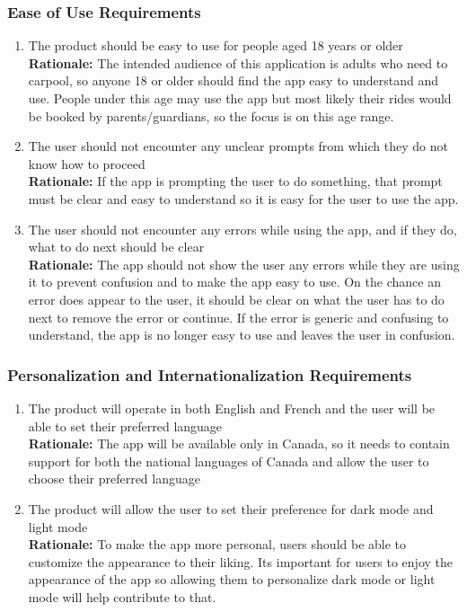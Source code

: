 \documentclass[]{article}
\begin{document}
\subsubsection{Ease of Use Requirements}
\label{ssub:ease_of_use_requirements}
\begin{enumerate}[{UH-EOU}1. ]
	\item The product should be easy to use for people aged 18 years or older \\
	{\bf Rationale:} The intended audience of this application is adults who need to carpool, so anyone 18 or older should find the app easy to understand and use. People under this age may use the app but most likely their rides would be booked by parents/guardians, so the focus is on this age range.
	\item The user should not encounter any unclear prompts from which they do not know how to proceed \\
	{\bf Rationale:} If the app is prompting the user to do something, that prompt must be clear and easy to understand so it is easy for the user to use the app.
	\item The user should not encounter any errors while using the app, and if they do, what to do next should be clear \\
	{\bf Rationale:} The app should not show the user any errors while they are using it to prevent confusion and to make the app easy to use. On the chance an error does appear to the user, it should be clear on what the user has to do next to remove the error or continue. If the error is generic and confusing to understand, the app is no longer easy to use and leaves the user in confusion.
\end{enumerate}

\subsubsection{Personalization and Internationalization Requirements}
\label{ssub:personalization_and_internationalization_requirements}
\begin{enumerate}[{UH-PI}1. ]
	\item The product will operate in both English and French and the user will be able to set their preferred language \\
	{\bf Rationale:} The app will be available only in Canada, so it needs to contain support for both the national languages of Canada and allow the user to choose their preferred language
	\item The product will allow the user to set their preference for dark mode and light mode \\
	{\bf Rationale:} To make the app more personal, users should be able to customize the appearance to their liking. Its important for users to enjoy the appearance of the app so allowing them to personalize dark mode or light mode will help contribute to that.
\end{enumerate}
\end{document}
